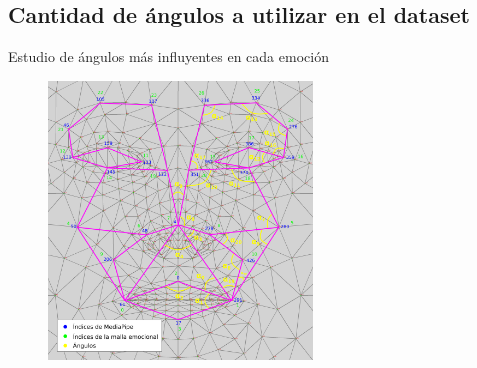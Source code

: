 \documentclass{beamer}
\begin{document}
\subsection{Cantidad de ángulos a utilizar en el dataset}
\begin{frame}{Estudio de ángulos más influyentes en cada emoción}
\begin{figure}[h!]
  \begin{center}
    \includegraphics[width=7cm]{figs/emotional_mesh_todos_angulos.png}
  \end{center}
\end{figure}
\end{frame}
\end{document}
